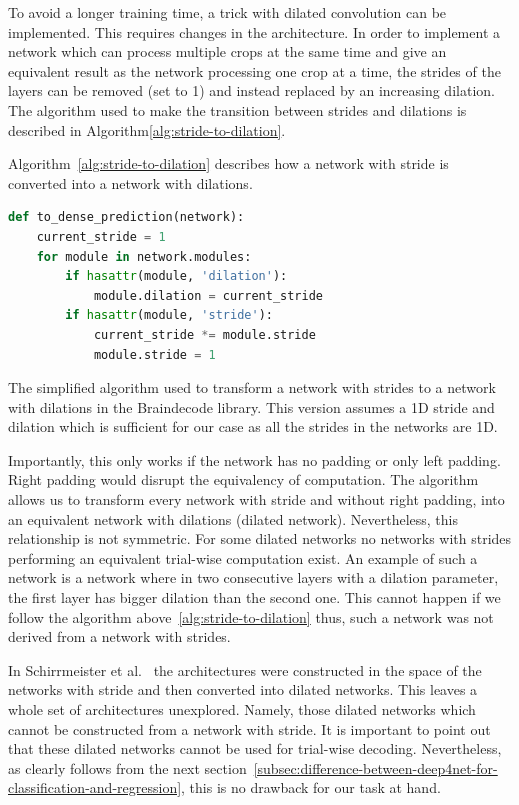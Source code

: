 \lipsum[3]

To avoid a longer training time, a trick with dilated convolution can be implemented.
This requires changes in the architecture.
In order to implement a network which can process multiple crops at the same time and give an equivalent result as the network processing one crop at a time, the strides of the layers can be removed (set to 1) and instead replaced by an increasing dilation.
The algorithm used to make the transition between strides and dilations is described in Algorithm\ref{alg:stride-to-dilation}.

Algorithm~\ref{alg:stride-to-dilation} describes how a network with stride is converted into a network with dilations.\\
\begin{algorithm}
\begin{lstlisting}[language=Python,label={lst:lstlisting}]
def to_dense_prediction(network):
	current_stride = 1
	for module in network.modules:
		if hasattr(module, 'dilation'):
			module.dilation = current_stride
		if hasattr(module, 'stride'):
			current_stride *= module.stride
			module.stride = 1
\end{lstlisting}
\caption{The simplified algorithm used to transform a network with strides to a network with dilations in the Braindecode library.
This version assumes a 1D stride and dilation which is sufficient for our case as all the strides in the networks are 1D.
}
\label{alg:stride-to-dilation}
\end{algorithm}

Importantly, this only works if the network has no padding or only left padding.
Right padding would disrupt the equivalency of computation.
The algorithm allows us to transform every network with stride and without right padding, into an equivalent network with dilations (dilated network).
Nevertheless, this relationship is not symmetric.
For some dilated networks no networks with strides performing an equivalent trial-wise computation exist.
An example of such a network is a network where in two consecutive layers with a dilation parameter, the first layer has bigger dilation than the second one.
This cannot happen if we follow the algorithm above~\ref{alg:stride-to-dilation} thus, such a network was not derived from a network with strides.

In Schirrmeister et al.~\cite{schirrmeister-deep-2017} the architectures were constructed in the space of the networks with stride and then converted into dilated networks.
This leaves a whole set of architectures unexplored.
Namely, those dilated networks which cannot be constructed from a network with stride.
It is important to point out that these dilated networks cannot be used for trial-wise decoding.
Nevertheless, as clearly follows from the next section~\ref{subsec:difference-between-deep4net-for-classification-and-regression}, this is no drawback for our task at hand.

